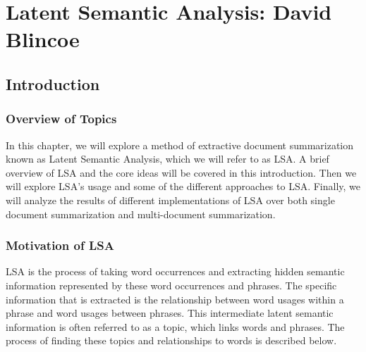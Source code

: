 \documentclass[../writeup.tex]{subfiles}
\begin{document}
\chapter{Latent Semantic Analysis: David Blincoe}\label{chapter:david}


\section{Introduction}\label{david:sec:intro}

\subsection{Overview of Topics}\label{david:sec:intro:overview}

In this chapter, we will explore a method of extractive document summarization known as Latent Semantic Analysis, which we will refer to as LSA. A brief overview of LSA and the core ideas will be covered in this introduction.
Then we will explore LSA's usage and some of the different approaches to LSA.
Finally, we will analyze the results of different implementations of LSA over both single document summarization and multi-document summarization.

\subsection{Motivation of LSA}\label{david:sec:intro:motivation}

LSA is the process of taking word occurrences and extracting hidden semantic information represented by these word occurrences and phrases. The specific information that is extracted is the relationship between word usages within a phrase and word usages between phrases.
This intermediate latent semantic information is often referred to as a topic, which links words and phrases.
The process of finding these topics and relationships to words is described below. 
\end{document}
